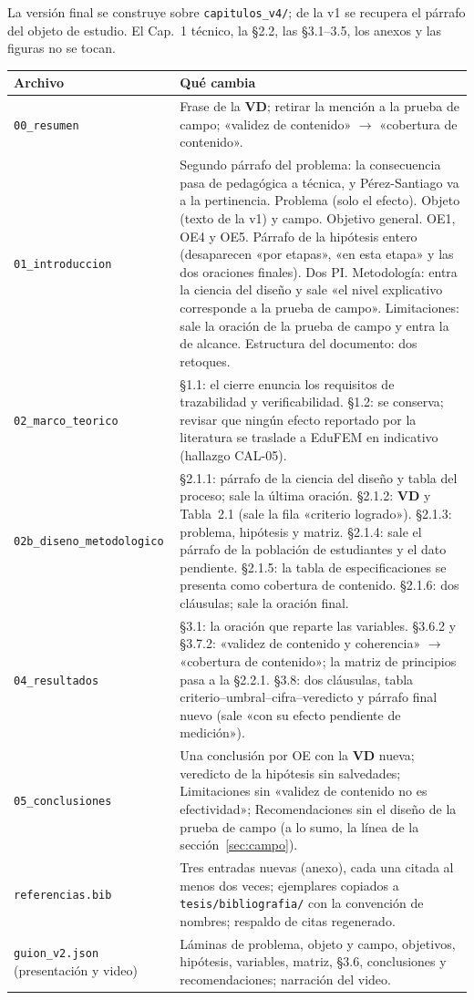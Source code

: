 \documentclass[11pt,a4paper]{article}
\newcommand{\vd}{\textbf{VD}}
\begin{document}
La versión final se construye sobre \texttt{capitulos\_v4/}; de la v1 se recupera el párrafo del objeto de estudio. El Cap.~1 técnico, la §2.2, las §3.1--3.5, los anexos y las figuras no se tocan.

{\small
\begin{longtable}{L{4.6cm}L{11.1cm}}
\toprule
\textbf{Archivo} & \textbf{Qué cambia} \\
\midrule
\endhead
\texttt{00\_resumen} & Frase de la \vd; retirar la mención a la prueba de campo; «validez de contenido» $\to$ «cobertura de contenido». \\
\texttt{01\_introduccion} & Segundo párrafo del problema: la consecuencia pasa de pedagógica a técnica, y Pérez-Santiago va a la pertinencia. Problema (solo el efecto). Objeto (texto de la v1) y campo. Objetivo general. OE1, OE4 y OE5. Párrafo de la hipótesis entero (desaparecen «por etapas», «en esta etapa» y las dos oraciones finales). Dos PI. Metodología: entra la ciencia del diseño y sale «el nivel explicativo corresponde a la prueba de campo». Limitaciones: sale la oración de la prueba de campo y entra la de alcance. Estructura del documento: dos retoques. \\
\texttt{02\_marco\_teorico} & §1.1: el cierre enuncia los requisitos de trazabilidad y verificabilidad. §1.2: se conserva; revisar que ningún efecto reportado por la literatura se traslade a EduFEM en indicativo (hallazgo CAL-05). \\
\texttt{02b\_diseno\_metodologico} & §2.1.1: párrafo de la ciencia del diseño y tabla del proceso; sale la última oración. §2.1.2: \vd{} y Tabla~2.1 (sale la fila «criterio logrado»). §2.1.3: problema, hipótesis y matriz. §2.1.4: sale el párrafo de la población de estudiantes y el dato pendiente. §2.1.5: la tabla de especificaciones se presenta como cobertura de contenido. §2.1.6: dos cláusulas; sale la oración final. \\
\texttt{04\_resultados} & §3.1: la oración que reparte las variables. §3.6.2 y §3.7.2: «validez de contenido y coherencia» $\to$ «cobertura de contenido»; la matriz de principios pasa a la §2.2.1. §3.8: dos cláusulas, tabla criterio--umbral--cifra--veredicto y párrafo final nuevo (sale «con su efecto pendiente de medición»). \\
\texttt{05\_conclusiones} & Una conclusión por OE con la \vd{} nueva; veredicto de la hipótesis sin salvedades; Limitaciones sin «validez de contenido no es efectividad»; Recomendaciones sin el diseño de la prueba de campo (a lo sumo, la línea de la sección~\ref{sec:campo}). \\
\texttt{referencias.bib} & Tres entradas nuevas (anexo), cada una citada al menos dos veces; ejemplares copiados a \texttt{tesis/bibliografia/} con la convención de nombres; respaldo de citas regenerado. \\
\texttt{guion\_v2.json} (presentación y video) &Láminas de problema, objeto y campo, objetivos, hipótesis, variables, matriz, §3.6, conclusiones y recomendaciones; narración del video. \\
\bottomrule
\end{longtable}}
\end{document}
